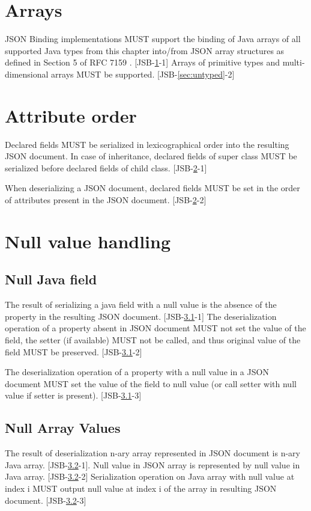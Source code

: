 \section{Arrays}
\label{sec:arrays}
JSON Binding implementations MUST support the binding of Java arrays of all supported Java types from this chapter into/from JSON array structures as defined in Section 5 of RFC 7159 \cite{rfc7159}. [JSB-\ref{sec:arrays}-1] Arrays of primitive types and multi-dimensional arrays MUST be supported. [JSB-\ref{sec:untyped}-2]

\section{Attribute order}
\label{sec:attributes}

Declared fields MUST be serialized in lexicographical order into the resulting JSON document. In case of inheritance, declared fields of super class MUST be serialized before declared fields of child class. [JSB-\ref{sec:attributes}-1]

When deserializing a JSON document, declared fields MUST be set in the order of attributes present in the JSON document. [JSB-\ref{sec:attributes}-2]

\section{Null value handling}
\label{sec:null}

\subsection{Null Java field}
\label{subsec:nullfield}
The result of serializing a java field with a null value is the absence of the property in the resulting JSON document. [JSB-\ref{subsec:nullfield}-1]
The deserialization operation of a property absent in JSON document MUST not set the value of the field, the setter (if available) MUST not be called, and thus original value of the field MUST be preserved. [JSB-\ref{subsec:nullfield}-2]

The deserialization operation of a property with a null value in a JSON document MUST set the value of the field to null value (or call setter with null value if setter is present). [JSB-\ref{subsec:nullfield}-3]

\subsection{Null Array Values}
\label{subsec:nullarray}
The result of deserialization n-ary array represented in JSON document is n-ary Java array. [JSB-\ref{subsec:nullarray}-1]. Null value in JSON array is represented by null value in Java array. [JSB-\ref{subsec:nullarray}-2]
Serialization operation on Java array with null value at index i MUST output null value at index i of the array in resulting JSON document. [JSB-\ref{subsec:nullarray}-3]

